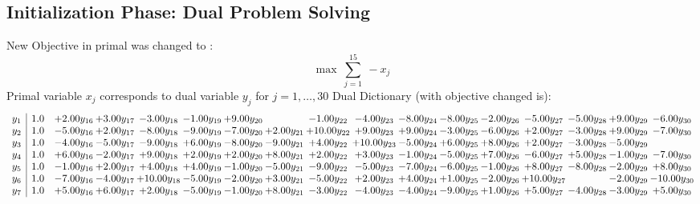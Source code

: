 \documentclass[9pt]{article}
\begin{document}
\subsection{Initialization Phase: Dual Problem Solving}
New Objective in primal was changed to : \[ \max\ \sum_{j=1}^{15}\ - x_j \] 
Primal variable $x_j$ corresponds to dual variable $y_j$ for $j = 1,\ldots,30$
Dual Dictionary (with objective changed is): 
\[\begin{array}{c| c c@{\hskip 2pt} c@{\hskip 2pt} c@{\hskip 2pt} c@{\hskip 2pt} c@{\hskip 2pt} c@{\hskip 2pt} c@{\hskip 2pt} c@{\hskip 2pt} c@{\hskip 2pt} c@{\hskip 2pt} c@{\hskip 2pt} c@{\hskip 2pt} c@{\hskip 2pt} c@{\hskip 2pt} c@{\hskip 2pt} }
 y_{1}   &  1.0 & +  2.00 y_{16} & +  3.00 y_{17} & -3.00 y_{18} & -1.00 y_{19} & +  9.00 y_{20} &   & -1.00 y_{22} & -4.00 y_{23} & -8.00 y_{24} & -8.00 y_{25} & -2.00 y_{26} & -5.00 y_{27} & -5.00 y_{28} & +  9.00 y_{29} & -6.00 y_{30}\\
 y_{2}   &  1.0 & -5.00 y_{16} & +  2.00 y_{17} & -8.00 y_{18} & -9.00 y_{19} & -7.00 y_{20} & +  2.00 y_{21} & + 10.00 y_{22} & +  9.00 y_{23} & +  9.00 y_{24} & -3.00 y_{25} & -6.00 y_{26} & +  2.00 y_{27} & -3.00 y_{28} & +  9.00 y_{29} & -7.00 y_{30}\\
 y_{3}   &  1.0 & -4.00 y_{16} & -5.00 y_{17} & -9.00 y_{18} & +  6.00 y_{19} & -8.00 y_{20} & -9.00 y_{21} & +  4.00 y_{22} & + 10.00 y_{23} & -5.00 y_{24} & +  6.00 y_{25} & +  8.00 y_{26} & +  2.00 y_{27} & -3.00 y_{28} & -5.00 y_{29} &   \\
 y_{4}   &  1.0 & +  6.00 y_{16} & -2.00 y_{17} & +  9.00 y_{18} & +  2.00 y_{19} & +  2.00 y_{20} & +  8.00 y_{21} & +  2.00 y_{22} & +  3.00 y_{23} & -1.00 y_{24} & -5.00 y_{25} & +  7.00 y_{26} & -6.00 y_{27} & +  5.00 y_{28} & -1.00 y_{29} & -7.00 y_{30}\\
 y_{5}   &  1.0 & -1.00 y_{16} & +  2.00 y_{17} & +  4.00 y_{18} & +  4.00 y_{19} & -1.00 y_{20} & -5.00 y_{21} & -9.00 y_{22} & -5.00 y_{23} & -7.00 y_{24} & -6.00 y_{25} & -1.00 y_{26} & +  8.00 y_{27} & -8.00 y_{28} & -2.00 y_{29} & +  8.00 y_{30}\\
 y_{6}   &  1.0 & -7.00 y_{16} & -4.00 y_{17} & + 10.00 y_{18} & -5.00 y_{19} & -2.00 y_{20} & +  3.00 y_{21} & -5.00 y_{22} & +  2.00 y_{23} & +  4.00 y_{24} & +  1.00 y_{25} & -2.00 y_{26} & + 10.00 y_{27} &   & -2.00 y_{29} & -10.00 y_{30}\\
 y_{7}   &  1.0 & +  5.00 y_{16} & +  6.00 y_{17} & +  2.00 y_{18} & -5.00 y_{19} & -1.00 y_{20} & +  8.00 y_{21} & -3.00 y_{22} & -4.00 y_{23} & -4.00 y_{24} & -9.00 y_{25} & +  1.00 y_{26} & +  5.00 y_{27} & -4.00 y_{28} & -3.00 y_{29} & +  5.00 y_{30}\\

\end{array}\]
\end{document}

